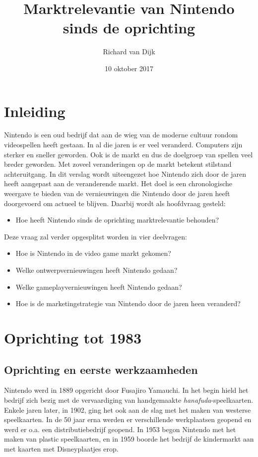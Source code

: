 \documentclass{article}
\title{Marktrelevantie van Nintendo sinds de oprichting}
\date{10 oktober 2017}
\author{Richard van Dijk}
\begin{document}
\maketitle
\newpage
\tableofcontents
\newpage
{}
\setcounter{page}{1}
\section{Inleiding}
Nintendo is een oud bedrijf dat aan de wieg van de moderne cultuur rondom videospellen heeft gestaan. In al die jaren is er veel veranderd. Computers zijn sterker en sneller geworden. Ook is de markt en dus de doelgroep van spellen veel breder geworden. Met zoveel veranderingen op de markt betekent stilstand achteruitgang. In dit verslag wordt uiteengezet hoe Nintendo zich door de jaren heeft aangepast aan de veranderende markt. Het doel is een chronologische weergave te bieden van de vernieuwingen die Nintendo door de jaren heeft doorgevoerd om actueel te blijven. Daarbij wordt als hoofdvraag gesteld:
\begin{itemize} \item Hoe heeft Nintendo sinds de oprichting marktrelevantie behouden? \end{itemize}
Deze vraag zal verder opgesplitst worden in vier deelvragen:
\begin{itemize}
\item Hoe is Nintendo in de video game markt gekomen?
\item Welke ontwerpvernieuwingen heeft Nintendo gedaan?
\item Welke gameplayvernieuwingen heeft Nintendo gedaan?
\item Hoe is de marketingstrategie van Nintendo door de jaren heen veranderd?
\end{itemize}
\section{Oprichting tot 1983}
\subsection{Oprichting en eerste werkzaamheden}
Nintendo werd in 1889 opgericht door Fusajiro Yamauchi. In het begin hield het bedrijf zich bezig met de vervaardiging van handgemaakte \textit{hanafuda}-speelkaarten. Enkele jaren later, in 1902, ging het ook aan de slag met het maken van westerse speelkaarten. In de 50 jaar erna werden er verschillende werkplaatsen geopend en werd er o.a. een distributiebedrijf geopend. In 1953 begon Nintendo met het maken van plastic speelkaarten, en in 1959 boorde het bedrijf de kindermarkt aan met kaarten met Disneyplaatjes erop. 
\end{document}
